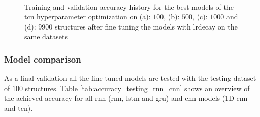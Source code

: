 \documentclass[conference]{IEEEtran}
\begin{document}
\begin{figure}[htp]
	\centering
	\quad
	\\
	\quad
	\caption{Training and validation accuracy history for the best models of the \gls{tcn} hyperparameter optimization on (a): $ 100 $, (b): $ 500 $, (c): $ 1000 $ and (d): $ 9900 $ structures after fine tuning the models with \gls{lrdecay} on the same datasets}
	\label{fig:accuracy_adaptiveLR_TCN}
\end{figure}

\subsubsection{Model comparison}
\label{sec:model_comparison}

As a final validation all the fine tuned models are tested with the testing dataset of $ 100 $ structures. Table \ref{tab:accuracy_testing_rnn_cnn} shows an overview of the achieved accuracy for all \gls{rnn} (\gls{rnn}, \gls{lstm} and \gls{gru}) and \gls{cnn} models (1D-\gls{cnn} and \gls{tcn}).
\end{document}
